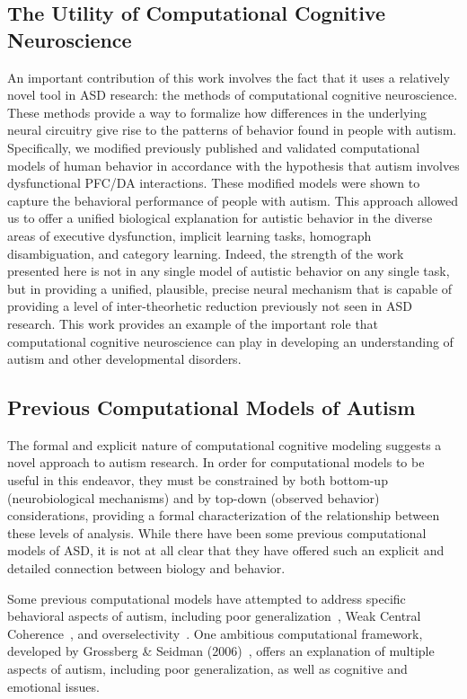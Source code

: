 %
%

\subsection{The Utility of Computational Cognitive Neuroscience}
An important contribution of this work involves the fact that it uses a relatively novel tool in ASD research: the methods of computational cognitive neuroscience. These methods provide a way to formalize how differences in the underlying neural circuitry give rise to the patterns of behavior found in people with autism. Specifically, we modified previously published and validated computational models of human behavior in accordance with the hypothesis that autism involves dysfunctional PFC/DA interactions. These modified models were shown to capture the behavioral performance of people with autism. This approach allowed us to offer a unified biological explanation for autistic behavior in the diverse areas of executive dysfunction, implicit learning tasks, homograph disambiguation, and category learning. Indeed, the strength of the work presented here is not in any single model of autistic behavior on any single task, but in providing a unified, plausible, precise neural mechanism that is capable of providing a level of inter-theorhetic reduction previously not seen in ASD research. This work provides an example of the important role that computational cognitive neuroscience can play in developing an understanding of autism and other developmental disorders.

\subsection{Previous Computational Models of Autism}
The formal and explicit nature of computational cognitive modeling suggests a novel approach to autism research. In order for computational models to be useful in this endeavor, they must be constrained by both bottom-up (neurobiological mechanisms) and by top-down (observed behavior) considerations, providing a formal characterization of the relationship between these levels of analysis. While there have been some previous computational models of ASD, it is not at all clear that they have offered such an explicit and detailed connection between biology and behavior.

Some previous computational models have attempted to address specific behavioral aspects of autism, including poor generalization~\cite{CohenIL:1994:AutismLearning,GustafssonL:1997:AutismMaps}, Weak Central Coherence~\cite{OLoughlinC:2000:Coherence}, and overselectivity~\cite{McClellandJL:2000:Autism}. One ambitious computational framework, developed by Grossberg \& Seidman (2006)~\nocite{RefWorks:146}, offers an explanation of multiple aspects of autism, including poor generalization, as well as cognitive and emotional issues.

